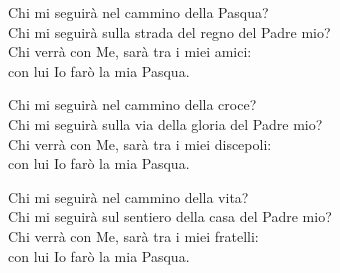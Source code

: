 
\strofa Chi mi seguirà nel cammino della Pasqua?\\
Chi mi seguirà sulla strada del regno del Padre mio?\\
Chi verrà con Me, sarà tra i miei amici:\\
con lui Io farò la mia Pasqua.

\spazio


\spazio

\strofa Chi mi seguirà nel cammino della croce?\\
Chi mi seguirà sulla via della gloria del Padre mio?\\
Chi verrà con Me, sarà tra i miei discepoli:\\
con lui Io farò la mia Pasqua.

\spazio


\spazio

\strofa Chi mi seguirà nel cammino della vita?\\
Chi mi seguirà sul sentiero della casa del Padre mio?\\
Chi verrà con Me, sarà tra i miei fratelli:\\
con lui Io farò la mia Pasqua.

\spazio

